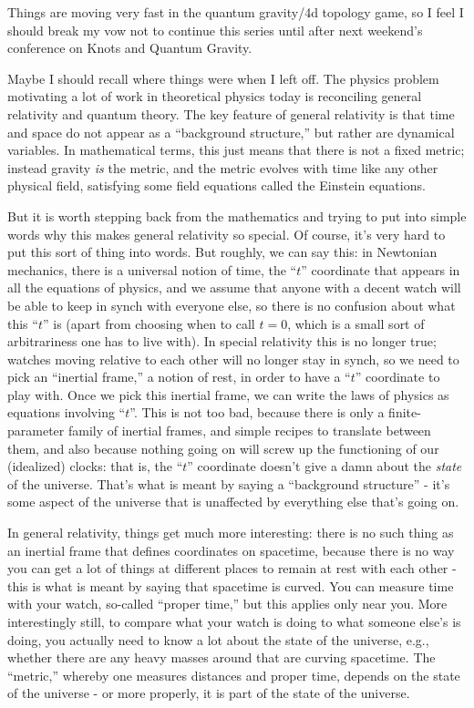 \documentclass{article}
\begin{document}
Things are moving very fast in the quantum gravity/4d topology game, so
I feel I should break my vow not to continue this series until after
next weekend's conference on Knots and Quantum Gravity.

Maybe I should recall where things were when I left off. The physics
problem motivating a lot of work in theoretical physics today is
reconciling general relativity and quantum theory. The key feature of
general relativity is that time and space do not appear as a
``background structure,'' but rather are dynamical variables. In
mathematical terms, this just means that there is not a fixed metric;
instead gravity \emph{is} the metric, and the metric evolves with time
like any other physical field, satisfying some field equations called
the Einstein equations.

But it is worth stepping back from the mathematics and trying to put
into simple words why this makes general relativity so special. Of
course, it's very hard to put this sort of thing into words. But
roughly, we can say this: in Newtonian mechanics, there is a universal
notion of time, the ``\(t\)'' coordinate that appears in all the
equations of physics, and we assume that anyone with a decent watch will
be able to keep in synch with everyone else, so there is no confusion
about what this ``\(t\)'' is (apart from choosing when to call
\(t = 0\), which is a small sort of arbitrariness one has to live with).
In special relativity this is no longer true; watches moving relative to
each other will no longer stay in synch, so we need to pick an
``inertial frame,'' a notion of rest, in order to have a ``\(t\)''
coordinate to play with. Once we pick this inertial frame, we can write
the laws of physics as equations involving ``\(t\)''. This is not too
bad, because there is only a finite-parameter family of inertial frames,
and simple recipes to translate between them, and also because nothing
going on will screw up the functioning of our (idealized) clocks: that
is, the ``\(t\)'' coordinate doesn't give a damn about the \emph{state}
of the universe. That's what is meant by saying a ``background
structure'' - it's some aspect of the universe that is unaffected by
everything else that's going on.

In general relativity, things get much more interesting: there is no
such thing as an inertial frame that defines coordinates on spacetime,
because there is no way you can get a lot of things at different places
to remain at rest with each other - this is what is meant by saying that
spacetime is curved. You can measure time with your watch, so-called
``proper time,'' but this applies only near you. More interestingly
still, to compare what your watch is doing to what someone else's is
doing, you actually need to know a lot about the state of the universe,
e.g., whether there are any heavy masses around that are curving
spacetime. The ``metric,'' whereby one measures distances and proper
time, depends on the state of the universe - or more properly, it is
part of the state of the universe.
\end{document}
